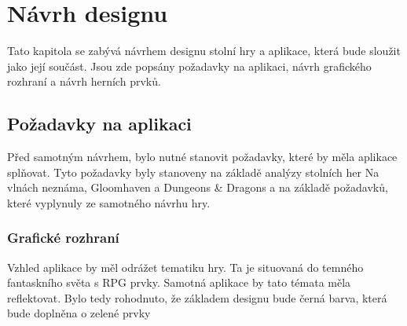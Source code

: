 \chapter{Návrh designu}
Tato kapitola se zabývá návrhem designu stolní hry a aplikace, která bude sloužit jako její součást. Jsou zde popsány požadavky na aplikaci, návrh grafického rozhraní a návrh herních prvků.

\section{Požadavky na aplikaci}
Před samotným návrhem, bylo nutné stanovit požadavky, které by měla aplikace splňovat. Tyto požadavky byly stanoveny na základě analýzy stolních her Na vlnách neznáma, Gloomhaven a Dungeons \& Dragons a na základě požadavků, které vyplynuly ze samotného návrhu hry.

\subsection{Grafické rozhraní}
Vzhled aplikace by měl odrážet tematiku hry. Ta je situovaná do temného fantaskního světa s RPG prvky. Samotná aplikace by tato témata měla reflektovat. Bylo tedy rohodnuto, že základem designu bude černá barva, která bude doplněna o zelené prvky 